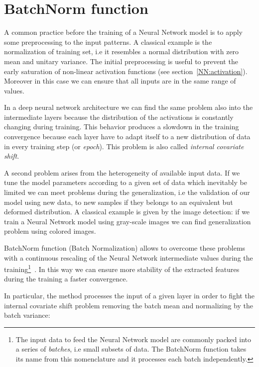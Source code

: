\documentclass{standalone}
\begin{document}
\section[BatchNorm function]{BatchNorm function}\label{NN:batchnorm}

A common practice before the training of a Neural Network model is to apply some preprocessing to the input patterns.
A classical example is the normalization of training set, i.e it resembles a normal distribution with zero mean and unitary variance.
The initial preprocessing is useful to prevent the early saturation of non-linear activation functions (see section~\ref{NN:activation}).
Moreover in this case we can ensure that all inputs are in the same range of values.

In a deep neural network architecture we can find the same problem also into the intermediate layers because the distribution of the activations is constantly changing during training.
This behavior produces a slowdown in the training convergence because each layer have to adapt itself to a new distribution of data in every training step (or \emph{epoch}).
This problem is also called \emph{internal covariate shift}.

A second problem arises from the heterogeneity of available input data.
If we tune the model parameters according to a given set of data which inevitably be limited we can meet problems during the generalization, i.e the validation of our model using new data, to new samples if they belongs to an equivalent but deformed distribution.
A classical example is given by the image detection: if we train a Neural Network model using gray-scale images we can find generalization problem using colored images.

BatchNorm function (Batch Normalization) allows to overcome these problems with a continuous rescaling of the Neural Network intermediate values during the training\footnote{
  The input data to feed the Neural Network model are commonly packed into a series of \emph{batches}, i.e small subsets of data.
  The BatchNorm function takes its name from this nomenclature and it processes each batch independently.
}~\cite{Sergey2015BatchNorm}.
In this way we can ensure more stability of the extracted features~\cite{Lecun2000EffBackProp} during the training a faster convergence.

In particular, the method processes the input of a given layer in order to fight the internal covariate shift problem removing the batch mean and normalizing by the batch variance:
\end{document}
